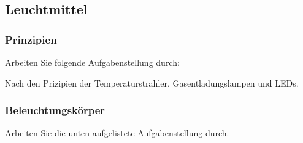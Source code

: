 \subsection{Leuchtmittel}
\subsubsection{Prinzipien}
Arbeiten Sie folgende Aufgabenstellung durch:

Nach den Prizipien der Temperaturstrahler, Gasentladungslampen und LEDs.

\subsubsection{Beleuchtungskörper}

Arbeiten Sie die unten aufgelistete Aufgabenstellung durch.

\clearpage

